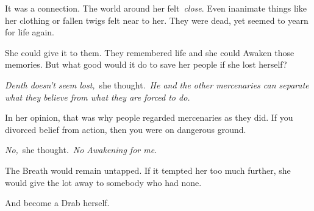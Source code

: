 It was a connection. The world around her felt~\textit{close}. Even inanimate things like her clothing or fallen twigs felt near to her. They were dead, yet seemed to yearn for life again.

She could give it to them. They remembered life and she could Awaken those memories. But what good would it do to save her people if she lost herself?

\textit{Denth doesn’t seem lost,}~she thought.~\textit{He and the other mercenaries can separate what they believe from what they are forced to do.}

In her opinion, that was why people regarded mercenaries as they did. If you divorced belief from action, then you were on dangerous ground.

\textit{No,}~she thought.~\textit{No Awakening for me.}

The Breath would remain untapped. If it tempted her too much further, she would give the lot away to somebody who had none.

And become a Drab herself.


